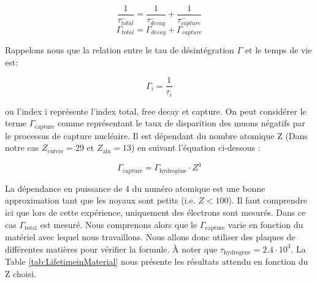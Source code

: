 \documentclass[12pt]{article}
\begin{document}
\begin{equation}
    \frac{1}{\tau_{total}^{-}} = \frac{1}{\tau_{decay}^{-}} + \frac{1}{\tau_{capture}^{-}}
\end{equation}
\begin{equation}
\Gamma_{total} = \Gamma_{decay} + \Gamma_{capture}
\end{equation}

Rappelons nous que la relation entre le tau de désintégration $\Gamma$ et le temps de vie est: 

\begin{equation}
    \Gamma_{i} = \frac{1}{\tau_{i}}
\end{equation}

ou l'index i représente l'index total, free decay et capture. On peut considérer le terme  $\Gamma_{\text{capture}}$ comme représentant le taux de disparition des muons négatifs par le processus de capture nucléaire. Il est dépendant du nombre atomique Z (Dans notre cas $Z_{\text{cuivre}} = 29$ et $Z_{\text{alu}} = 13$) en suivant l'équation ci-dessous \cite{tamamushi_lifetime_nodate}: 

\begin{equation}
     \Gamma_{\text{capture}} =  \Gamma_{\text{hydrogène}} \cdot Z^{4}
\end{equation}

La dépendance en puissance de 4 du numéro atomique est une bonne approximation tant que les noyaux sont petits (i.e. $Z<100$). Il faut comprendre ici que lors de cette expérience, uniquement des électrons sont mesurés. Dans ce cas $\Gamma_{\text{total}}$ est mesuré. Nous comprenons alors que le $\Gamma_{\text{capture}}$ varie en fonction du matériel avec lequel nous travaillons. Nous allons donc utiliser des plaques de différentes matières pour vérifier la formule. À noter que $\tau_{\text{hydrogène}}=2.4\cdot10^{3}$. La Table \ref{tab:LifetimeinMaterial} nous présente les résultats attendu en fonction du Z choisi.

\begin{table}[htbp]
  \centering
  \captionsetup{width=0.9\textwidth}
  \caption{Temps de vie des muons positifs et négatifs dans différents matériaux. Le temps de vie des muons positifs est tout le temps 2.2 \SIUnitSymbolMicro s, alors que le temps de vie des muons négatifs dépends du nombre atomique Z \cite{tamamushi_lifetime_nodate}.}
  \label{tab:LifetimeinMaterial}
\end{table}
\end{document}
